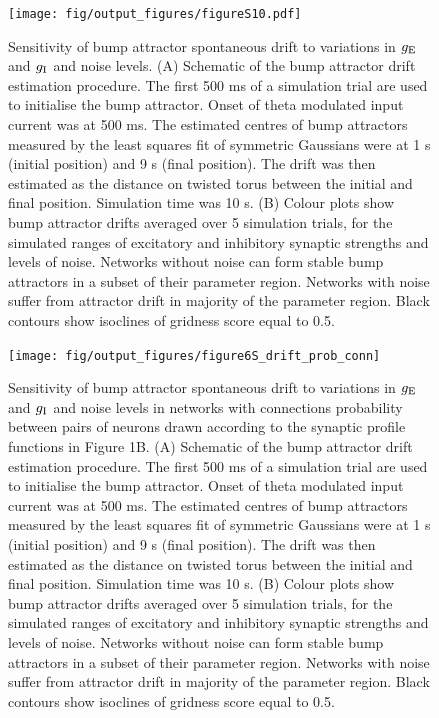 \documentclass[a4paper,12pt]{article}
\newcommand{\ssc}[3]{\ensuremath{#1_{\text{#2}_{\text{#3}}}}}
\newcommand{\gE      }{\ssc{g}      {\scriptsize{E}}{}}
\newcommand{\gI      }{\ssc{g}      {\scriptsize{I}}{}}
\begin{document}
\begin{figure}[ht!]
    \internallinenumbers
    \centering
        \texttt{[image: fig/output\_figures/figureS10.pdf]}
    \caption{Sensitivity of bump attractor spontaneous drift to
    variations in $\gE$ and $\gI$ and noise levels. (A) Schematic
    of the bump attractor drift estimation procedure. The first 500 ms of a
    simulation trial are used to initialise the bump attractor. Onset of theta
    modulated input current was at 500 ms. The estimated centres of bump
    attractors measured by the least squares fit of symmetric Gaussians were at
    1 s (initial position) and 9 s (final position). The drift was then
    estimated as the distance on twisted torus between the initial and final
    position. Simulation time was 10 s. (B) Colour plots show bump
    attractor drifts averaged over 5 simulation trials, for the simulated
    ranges of excitatory and inhibitory synaptic strengths and levels of noise.
    Networks without noise can form stable bump attractors in a subset of
    their parameter region. Networks with noise suffer from attractor drift in
    majority of the parameter region. Black contours show isoclines of gridness
    score equal to 0.5.}
\end{figure}

\clearpage

\begin{figure}[ht!]
    \internallinenumbers
    \centering
        \texttt{[image: fig/output\_figures/figure6S\_drift\_prob\_conn]}
    \caption{Sensitivity of bump attractor spontaneous drift to variations in
    $\gE$ and $\gI$ and noise levels in networks with connections probability
    between pairs of neurons drawn according to the synaptic profile functions
    in Figure 1B. (A) Schematic of the bump attractor drift estimation
    procedure. The first 500 ms of a simulation trial are used to initialise
    the bump attractor. Onset of theta modulated input current was at 500 ms.
    The estimated centres of bump attractors measured by the least squares fit
    of symmetric Gaussians were at 1 s (initial position) and 9 s (final
    position). The drift was then estimated as the distance on twisted torus
    between the initial and final position. Simulation time was 10 s. (B)
    Colour plots show bump attractor drifts averaged over 5 simulation trials,
    for the simulated ranges of excitatory and inhibitory synaptic strengths
    and levels of noise.  Networks without noise can form stable bump
    attractors in a subset of their parameter region. Networks with noise
    suffer from attractor drift in majority of the parameter region. Black
    contours show isoclines of gridness score equal to 0.5.}
\end{figure}
\end{document}
